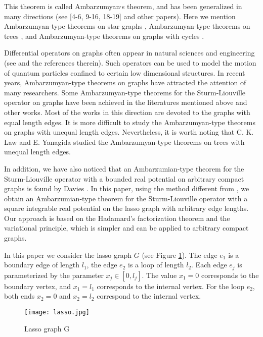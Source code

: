 \documentclass[reqno,11pt,centertags]{amsart}
\numberwithin{equation}{section}
\theoremstyle{definition}
\begin{document}
This theorem is called Ambarzumyan$^{\textbf{,}}$s theorem, and has been generalized in many directions (see [4-6, 9-16, 18-19] and other papers). Here we mention Ambarzumyan-type theorems on star graphs \cite{Piv, YHY1}, Ambarzumyan-type theorems on trees \cite{CP, LY}, and Ambarzumyan-type theorems on graphs with cycles \cite{Kiss, YX}.

Differential operators on graphs often appear in natural sciences and engineering (see \cite{BCFK, BK} and the references therein). Such operators can be used to model the motion of quantum particles confined to certain low dimensional structures. In recent years, Ambarzumyan-type theorems on graphs have attracted the attention of many researchers. Some Ambarzumyan-type theorems for the Sturm-Liouville operator on graphs have been achieved in the literatures mentioned above and other works. Most of the works in this direction are devoted to the graphs with equal length edges. It is more difficult to study the Ambarzumyan-type theorems on graphs with unequal length edges. Nevertheless, it is worth noting that C. K. Law and E. Yanagida \cite{LY} studied the Ambarzumyan-type theorems on trees with unequal length edges.

In addition, we have also noticed that an Ambarzumian-type theorem for the Sturm-Liouville operator with a bounded real potential on arbitrary compact graphs is found by Davies \cite{Davies}. In this paper, using the method different from \cite{Davies}, we obtain an Ambarzumian-type theorem
for the Sturm-Liouville operator with a square integrable real potential on the lasso graph with arbitrary edge lengths. Our approach is based on the Hadamard's factorization theorem and the variational principle, which is simpler and can be applied to arbitrary compact graphs.

In this paper we consider the lasso graph $G$ (see Figure \ref{lasso}). The edge $e_{1}$ is a boundary edge of length $l_{1}$,  the edge $e_{2}$ is a loop of length $l_{2}$. Each edge $e_{j}$ is parameterized by the parameter $x_{j}\in[0,l_{j}]$. The value $x_{1}=0$ corresponds to the boundary vertex, and $x_{1}=l_{1}$ corresponds to the internal vertex. For the loop  $e_{2}$, both ends $x_{2}=0$ and $x_{2}=l_{2}$ correspond to the internal vertex.
\begin{figure}
  \centering
  \texttt{[image: lasso.jpg]}\\
  \caption{Lasso graph G}\label{lasso}
\end{figure}
\end{document}
